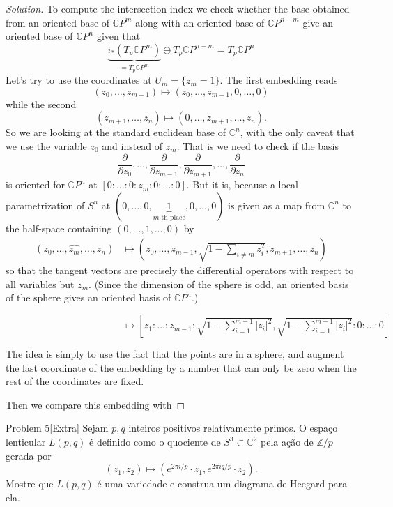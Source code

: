 \begin{proof}[Solution]
To compute the intersection index we check whether the base obtained from an oriented base of \(\mathbb{C}P^{m}\) along with an oriented base of \(\mathbb{C}P^{n-m}\) give an oriented base of \(\mathbb{C}P^{n}\) given that
\[\underbrace{i_*(T_p \mathbb{C}P^{m})}_{=T_p\mathbb{C}P^m}\oplus T_p\mathbb{C}P^{n-m}=T_p\mathbb{C}P^{n}\]
Let's try to use the coordinates at \(U_m=\{z_m=1\}\). The first embedding reads
\[(z_0,\ldots,z_{m-1})\mapsto (z_0,\ldots,z_{m-1},0,\ldots,0)\]
while the second
\[(z_{m+1},\ldots,z_n)\mapsto (0,\ldots,z_{m+1},\ldots,z_n).\]
So we are looking at the standard euclidean base of \(\mathbb{C}^n\), with the only caveat that we use the variable \(z_0\) and instead of \(z_m\). That is we need to check if the basis
\[\frac{\partial }{\partial z_0},\ldots,\frac{\partial }{\partial z_{m-1}},\frac{\partial }{\partial z_{m+1}},\ldots,\frac{\partial }{\partial z_n}\]
is oriented for \(\mathbb{C}P^{n}\) at \([0:\ldots:0:z_m:0:\ldots:0]\). But it is, because a local parametrization of \(S^{n}\) at \((0,\ldots,0,\underbrace{1}_{m\text{-th place} },0,\ldots,0)\) is given as a map from \(\mathbb{C}^n\) to the half-space containing \((0,\ldots,1,\ldots,0)\) by
\begin{align*}
	(z_0,\ldots,\widehat{z_m},\ldots,z_n) &\longmapsto \left(z_0,\ldots,z_{m-1},\sqrt{1-\sum_{i\neq m}z_i^2} ,z_{m+1},\ldots,z_n\right) 
\end{align*}
so that the tangent vectors are precisely the differential operators with respect to all variables but \(z_m\). (Since the dimension of the sphere is odd, an oriented basis of the sphere gives an oriented basis of  \(\mathbb{C}P^{n}\).)


\(\qquad \qquad \qquad \qquad \qquad \qquad  \longmapsto \left[z_1:\ldots:z_{m-1}:\sqrt{1-\sum_{i=1}^{m-1}|z_i|^2},\sqrt{1-\sum_{i=1}^{m-1}|z_i|^2}:0:\ldots:0\right] \)

The idea is simply to use the fact that the points are in a sphere, and augment the last coordinate of the embedding by a number that can only be zero when the rest of the coordinates are fixed.

Then we compare this embedding with\fi
\end{proof}

\begin{thing1}{Problem 5}[Extra]\label{prob:5}\leavevmode
Sejam \(p,q\) inteiros positivos relativamente primos. O espaço lenticular \(L(p,q)\) é definido como o quociente de  \(S^3 \subset \mathbb{C}^2\) pela ação de \(\mathbb{Z}/p\) gerada por
\[(z_1,z_2)\mapsto (e^{2\pi i/p}\cdot z_1,e^{2\pi i q/p}\cdot z_2).\]
Mostre que \(L(p,q)\) é uma variedade e construa um diagrama de Heegard para ela.
\end{thing1}

